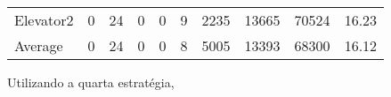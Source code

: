 \documentclass[a4paper]{article}
\begin{document}
\begin{table}[h]
\begin{tabular}{@{}llllllllll@{}}
Elevator2 & 0        & 24            & 0           & 0                                                               & 9                                                                  & 2235                                                         & 13665                                                 & 70524                                                   & 16.23         \\
Average   & 0     & 24         & 0        & 0                                                               & 8                                                               & 5005                                                         & 13393                                                 &  68300                                                  & 16.12          \\ \bottomrule
\end{tabular}
\end{table}

\newpage

Utilizando a quarta estratégia,
\end{document}
